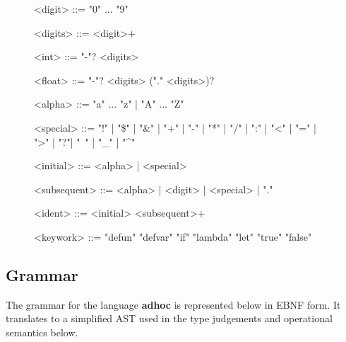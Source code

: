 \documentclass[11pt,a4paper]{article}
\begin{document}
\begin{figure}[H]
\small
\renewcommand{\grammarlabel}[2]{\synt{#1}\hfill#2}
\setlength{\grammarindent}{8em}
\begin{grammar}
<digit> ::= "0" ... "9"

<digits> ::= <digit>+

<int> ::= "-"? <digits>

<float> ::= "-"? <digits> ("." <digits>)?

<alpha> ::= "a" ... "z" | "A" ... "Z"

<special> ::= "!" | "\$" | "\&" | "+" | "-" | "*" | "/" | ":" | "<" | "=" | ">" | "?"| "~" | "_" | "^"

<initial> ::= <alpha> | <special>

<subsequent> ::= <alpha> | <digit> | <special> | "."

<ident> ::= <initial> <subsequent>+

<keywork> ::= "defun"
    \alt "defvar"
    \alt "if"
    \alt "lambda"
    \alt "let"
    \alt "true"
    \alt "false"
\end{grammar}
\end{figure}


\subsection{Grammar}

The grammar for the language \textbf{adhoc} is represented below in
EBNF form. It translates to a simplified AST used in the type judgements
and operational semantics below.

\end{document}
